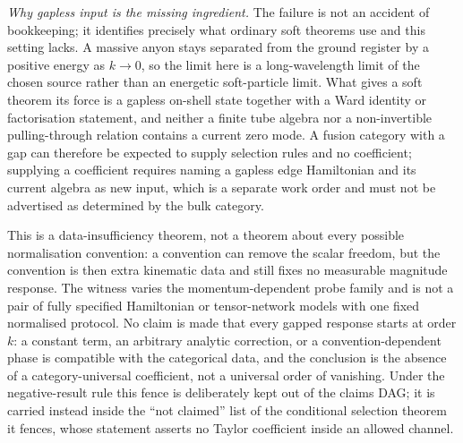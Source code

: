 \emph{Why gapless input is the missing ingredient.} The failure is not an
accident of bookkeeping; it identifies precisely what ordinary soft theorems
use and this setting lacks. A massive anyon stays separated from the ground
register by a positive energy as $k \to 0$, so the limit here is a
long-wavelength limit of the chosen source rather than an energetic
soft-particle limit. What gives a soft theorem its force is a gapless on-shell
state together with a Ward identity or factorisation statement, and neither a
finite tube algebra nor a non-invertible pulling-through relation contains a
current zero mode. A fusion category with a gap can therefore be expected to
supply selection rules and no coefficient; supplying a coefficient requires
naming a gapless edge Hamiltonian and its current algebra as new input, which
is a separate work order and must not be advertised as determined by the bulk
category.

\begin{scope}
\label{scope:no-cat-soft}
This is a data-insufficiency theorem, not a theorem about every possible
normalisation convention: a convention can remove the scalar freedom, but the
convention is then extra kinematic data and still fixes no measurable magnitude
response. The witness varies the momentum-dependent probe family and is not a
pair of fully specified Hamiltonian or tensor-network models with one fixed
normalised protocol. No claim is made that every gapped response starts at
order $k$: a constant term, an arbitrary analytic correction, or a
convention-dependent phase is compatible with the categorical data, and the
conclusion is the absence of a category-universal coefficient, not a universal
order of vanishing. Under the negative-result rule this fence is deliberately
kept out of the claims DAG; it is carried instead inside the ``not claimed''
list of the conditional selection theorem it fences, whose statement asserts no
Taylor coefficient inside an allowed channel.
\end{scope}

